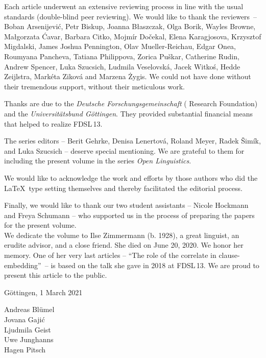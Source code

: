 Each article underwent an extensive reviewing process in line with the usual standards (double-blind peer reviewing). We would like to thank the reviewers~-- Boban Arsenijević, Petr Biskup, Joanna Błaszczak, Olga Borik, Wayles Browne, Małgorzata Ćavar, Barbara Citko, Mojmír Dočekal, Elena Karagjosova, Krzysztof Migdalski, James Joshua Pennington, Olav Mueller-Reichau, Edgar Onea, Roum\-yana Pancheva, Tatiana Philippova, Zorica Puškar, Catherine Rudin, Andrew Spencer, Luka Szucsich, Ludmila Veselovská, Jacek Witkoś, Hedde Zeijlstra, Markéta Ziková and Marzena Żygis. We could not have done without their tremendous support, without their meticulous work.

Thanks are due to the \textit{Deutsche Forschungsgemeinschaft} ( Research Foundation) and the \textit{Universitätsbund Göttingen}. They provided substantial financial means that helped to realize FDSL\,13.

The series editors -- Berit Gehrke, Denisa Lenertová, Roland Meyer, Radek Šimík, and Luka Szucsich -- deserve special mentioning. We are grateful to them for including the present volume in the series \textit{Open  Linguistics}.

We would like to acknowledge the work and efforts by those authors who did the \LaTeX\ type setting themselves and thereby facilitated the editorial process.

Finally, we would like to thank our two student assistants -- Nicole Hockmann and Freya Schumann -- who supported us in the process of preparing the papers for the present volume.\\

\noindent We dedicate the volume to Ilse Zimmermann (b. 1928), a great linguist, an erudite advisor, and a close friend. She died on June 20, 2020. We honor her memory. One of her very last articles – ``The role of the correlate in clause-embedding''~– is based on the talk she gave in 2018 at FDSL\,13. We are proud to present this article to the public.

\null\hfill Göttingen, 1 March 2021

\null\hfill Andreas Blümel\\
\null\hfill Jovana Gajić\\
\null\hfill Ljudmila Geist\\
\null\hfill Uwe Junghanns\\
\null\hfill Hagen Pitsch\\

% 
